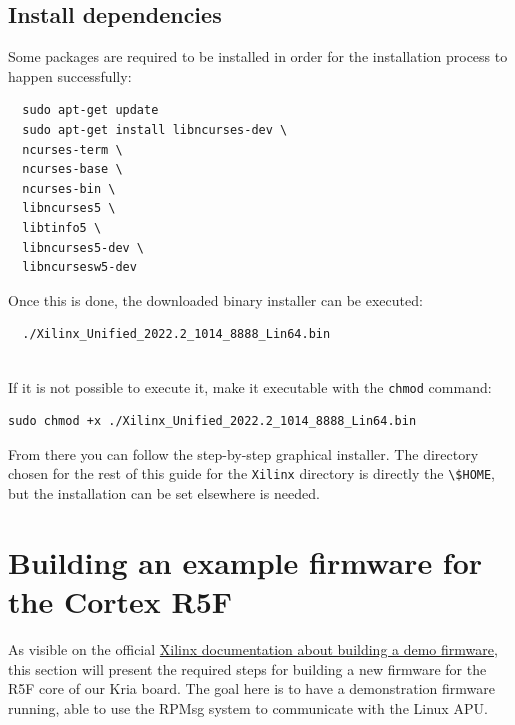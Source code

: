 \documentclass[10pt]{article}
\begin{document}
\subsection{Install dependencies}
Some packages are required to be installed in order for the installation process to happen successfully:
\begin{tcolorbox}
\begin{verbatim}
  sudo apt-get update
  sudo apt-get install libncurses-dev \
  ncurses-term \
  ncurses-base \
  ncurses-bin \
  libncurses5 \
  libtinfo5 \
  libncurses5-dev \
  libncursesw5-dev

\end{verbatim}
\end{tcolorbox}

Once this is done, the downloaded binary installer can be executed:
\begin{tcolorbox}
\begin{verbatim}
  ./Xilinx_Unified_2022.2_1014_8888_Lin64.bin
  
\end{verbatim}
\end{tcolorbox}

If it is not possible to execute it, make it executable with the \verb|chmod| command:
\begin{tcolorbox}
\begin{verbatim}
sudo chmod +x ./Xilinx_Unified_2022.2_1014_8888_Lin64.bin
\end{verbatim}
\end{tcolorbox}

From there you can follow the step-by-step graphical installer.
The directory chosen for the rest of this guide for the \verb|Xilinx| directory
is directly the \verb|\$HOME|, but the installation can be set elsewhere is needed.


\section{Building an example firmware for the Cortex R5F}
As visible on the official \href{https://xilinx-wiki.atlassian.net/wiki/spaces/A/pages/1837006921/OpenAMP+Base+Hardware+Configurations\#Build-RPU-firmware}{Xilinx documentation about building a demo firmware}, this section will present the required steps for building a new firmware for the R5F core of our Kria board. The goal
here is to have a demonstration firmware running, able to use the RPMsg system to communicate with the Linux APU.
\end{document}
